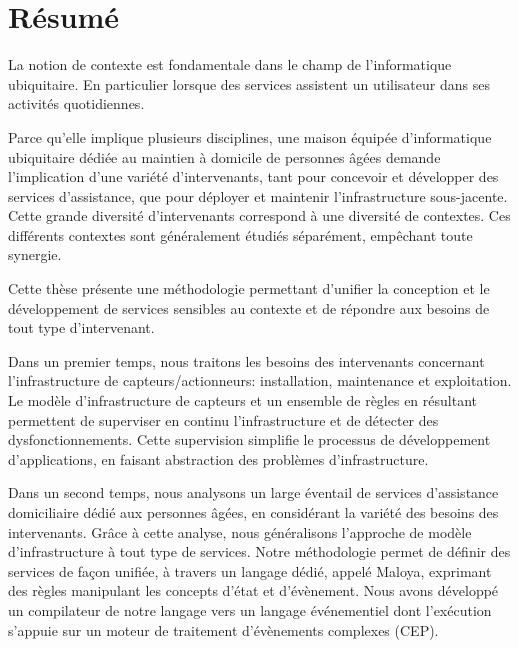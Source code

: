 
\chapter*{Résumé}
\vspace*{-10mm}
\begin{small}
La notion de contexte est fondamentale dans le champ de l’informatique
ubiquitaire. En particulier lorsque des services assistent un utilisateur dans ses activités quotidiennes. 

Parce qu’elle implique plusieurs disciplines, une maison équipée
d’informatique ubiquitaire dédiée au maintien à
domicile de personnes âgées demande l’implication d'une variété
d’intervenants, tant pour concevoir et développer des services
d'assistance, que pour déployer et maintenir l'infrastructure
sous-jacente. Cette grande diversité d’intervenants correspond à une diversité de contextes. Ces différents contextes sont généralement étudiés séparément, empêchant toute synergie.

Cette thèse présente une méthodologie permettant d'unifier la conception
et le développement de services sensibles au contexte et de répondre aux
besoins de tout type d'intervenant.

Dans un premier temps, nous traitons les besoins des intervenants
concernant l’infrastructure de capteurs/actionneurs: installation, maintenance et exploitation. 
Le modèle d’infrastructure de capteurs et un ensemble de règles 
en résultant
permettent de superviser en continu l’infrastructure et de détecter des dysfonctionnements. Cette supervision 
simplifie le processus de développement d’applications, en faisant abstraction des problèmes d’infrastructure.

Dans un second temps, nous analysons un large éventail de services d’assistance domiciliaire dédié aux personnes âgées, 
en considérant la variété des besoins des intervenants. Grâce à cette analyse, nous généralisons l’approche 
de modèle d'infrastructure à tout type de services. 
Notre méthodologie permet de définir des services de façon unifiée, à travers 
un langage dédié, appelé Maloya, exprimant
des règles manipulant les concepts d’état et d’évènement. 
Nous avons développé un compilateur de notre langage vers un langage événementiel dont l’exécution s’appuie sur un moteur de traitement d’évènements complexes (CEP).


\end{small}
